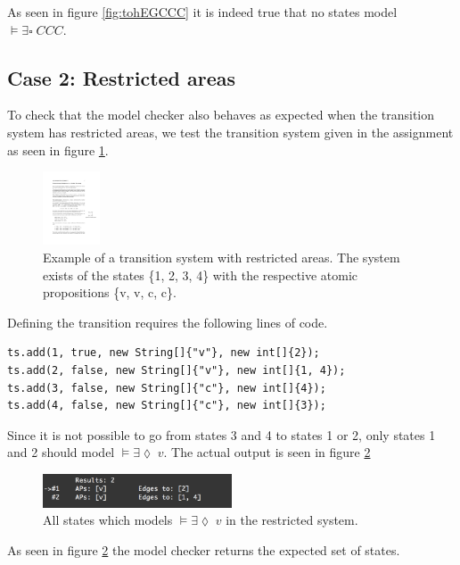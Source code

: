As seen in figure \ref{fig:tohEGCCC} it is indeed true that no states model $\models \exists \square \; CCC$.

\subsection{Case 2: Restricted areas}
To check that the model checker also behaves as expected when the transition system has restricted areas, we test the transition system given in the assignment as seen in figure \ref{fig:restrictedsystem}.

\begin{figure}[H]
    \centering
    \includegraphics[width=0.15\textwidth]{fig/restrictedsystem.pdf}
    \caption{Example of a transition system with restricted areas. The system exists of the states \{1, 2, 3, 4\} with the respective atomic propositions \{v, v, c, c\}.}
    \label{fig:restrictedsystem}
\end{figure}

Defining the transition requires the following lines of code.
\begin{lstlisting}
ts.add(1, true, new String[]{"v"}, new int[]{2});
ts.add(2, false, new String[]{"v"}, new int[]{1, 4});
ts.add(3, false, new String[]{"c"}, new int[]{4});
ts.add(4, false, new String[]{"c"}, new int[]{3});
\end{lstlisting}

Since it is not possible to go from states 3 and 4 to states 1 or 2, only states 1 and 2 should model $\models \exists \lozenge \; v$. The actual output is seen in figure \ref{fig:rsEFv}

\begin{figure}[H]
    \centering
    \includegraphics[width=0.5\textwidth]{fig/rsEFv.png}
    \caption{All states which models $\models \exists \lozenge \; v$ in the restricted system.}
    \label{fig:rsEFv}
\end{figure}

As seen in figure \ref{fig:rsEFv} the model checker returns the expected set of states.\\

